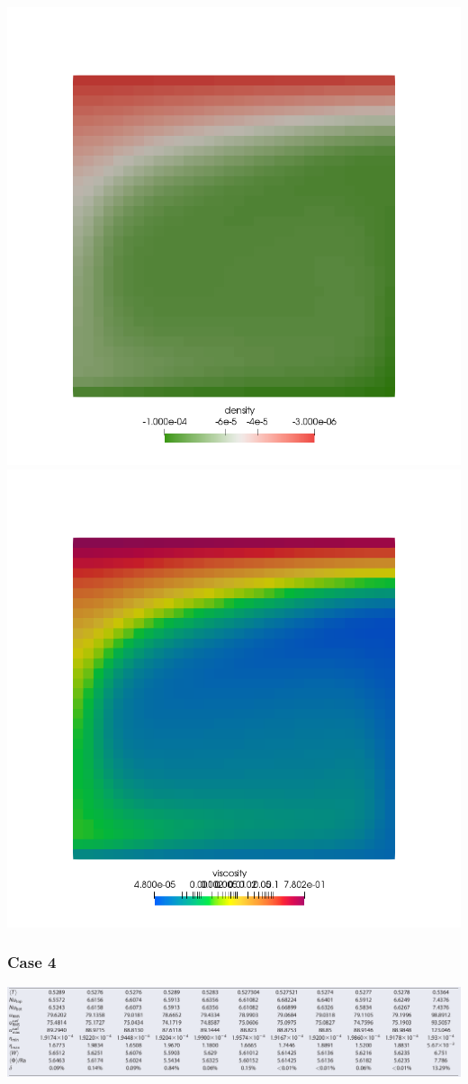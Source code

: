 \begin{center}
\includegraphics[width=7.cm]{python_codes/fieldstone_28/results_case3/rho}
\includegraphics[width=7.cm]{python_codes/fieldstone_28/results_case3/mueff}
\end{center}




\newpage %
\subsubsection{Case 4}

\includegraphics[width=16cm]{python_codes/fieldstone_28/results_case4/tosn15}

